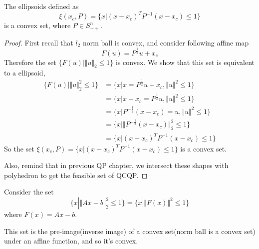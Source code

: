 \begin{example}
The ellipsoids defined as
\begin{equation*}
\xi(x_c, P) =\{x|(x - x_c)^TP^{-1}(x - x_c) \leq 1 \}
\end{equation*}
is a convex set, where $P\in S^n_{++}$.

\begin{proof}
	First recall that $l_2$ norm ball is convex, and consider following affine map
	$$F(u) = P^{\frac{1}{2}}u + x_c$$
	Therefore the set $\{F(u) | \Vert u\Vert_2 \leq 1 \}$ is convex. We show that this set is equivalent to a ellipsoid,
\begin{align*}
\{F(u) | \Vert u\Vert^2_2 \leq 1 \} &= \{x|x = P^{\frac{1}{2}}u+x_c, \Vert u\Vert^2 \leq 1 \}\\
&= \{x|x - x_c = P^{\frac{1}{2}}u, \Vert u\Vert^2 \leq 1 \}\\
&= \{x|P^{-\frac{1}{2}}(x - x_c) =u, \Vert u\Vert^2 \leq 1 \}\\
&= \{x|\Vert P^{-\frac{1}{2}}(x - x_c)\Vert^2_2 \leq 1 \}\\
&= \{x|(x - x_c)^TP^{-1}(x - x_c) \leq 1 \}
\end{align*}
So the set $\xi(x_c, P) =\{x|(x - x_c)^TP^{-1}(x - x_c) \leq 1 \}$ is a convex set.

Also, remind that in previous QP chapter, we intersect these shapes with polyhedron to get the feasible set of QCQP.
\end{proof}
\end{example}

\begin{example}Consider the set
	$$\{x | \Vert Ax - b \Vert^2_2 \leq 1 \} = \{x | \Vert F(x) \Vert^2 \leq 1 \}$$
	where $F(x) = Ax - b$.

	This set is the pre-image(inverse image) of a convex set(norm ball is a convex set) under an affine function, and so it's convex.
\end{example}




